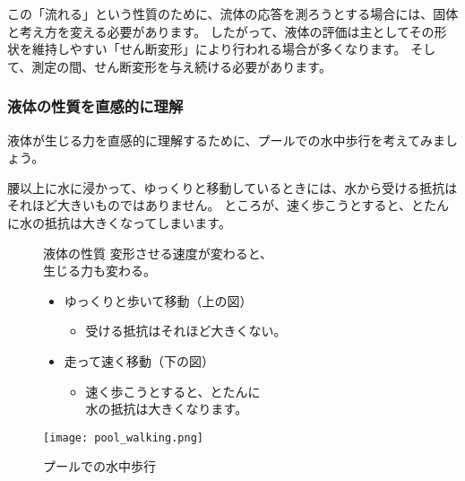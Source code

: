 \documentclass[uplatex,dvipdfmx,a4paper,11pt]{jsarticle}
\begin{document}
この「流れる」という性質のために、流体の応答を測ろうとする場合には、固体と考え方を変える必要があります。
したがって、液体の評価は主としてその形状を維持しやすい「せん断変形」により行われる場合が多くなります。
そして、測定の間、せん断変形を与え続ける必要があります。

\subsubsection{液体の性質を直感的に理解}

液体が生じる力を直感的に理解するために、プールでの水中歩行を考えてみましょう。

腰以上に水に浸かって、ゆっくりと移動しているときには、水から受ける抵抗はそれほど大きいものではありません。
ところが、速く歩こうとすると、とたんに水の抵抗は大きくなってしまいます。

\begin{figure}[htb]
	\begin{center}
		\begin{minipage}{0.55\textwidth}
			\large
			\begin{itembox}[l]{液体の性質}
				変形させる速度が変わると、\\生じる力も変わる。
				\begin{itemize}
					\item ゆっくりと歩いて移動（上の図）
					\begin{itemize}
						\item 受ける抵抗はそれほど大きくない。
					\end{itemize}
					\item 走って速く移動（下の図）
					\begin{itemize}
						\item 速く歩こうとすると、とたんに\\水の抵抗は大きくなります。
					\end{itemize}
				\end{itemize}
			\end{itembox}
		\end{minipage}
		\begin{minipage}{0.35\textwidth}
			\begin{center}
			\texttt{[image: pool\_walking.png]}
			\end{center}
		\end{minipage}
		\caption{プールでの水中歩行}
		\label{pool_walk}
	\end{center}
\end{figure}
\end{document}
